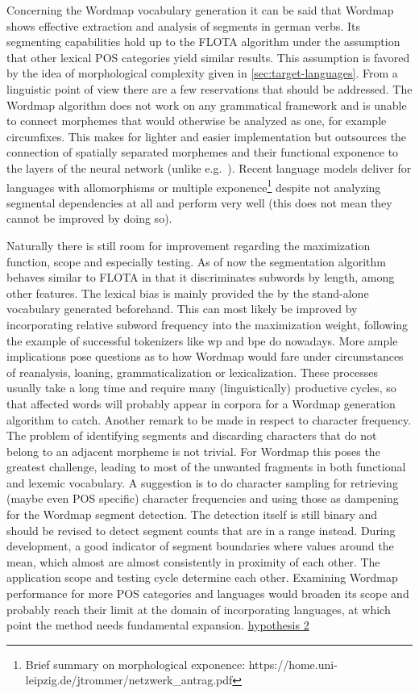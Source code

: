 Concerning the Wordmap vocabulary generation it can be said that Wordmap shows effective extraction and analysis of segments in german verbs.
Its segmenting capabilities hold up to the FLOTA algorithm under the assumption that other lexical POS categories yield similar results.
This assumption is favored by the idea of morphological complexity given in \autoref{sec:target-languages}.
From a linguistic point of view there are a few reservations that should be addressed.
The Wordmap algorithm does not work on any grammatical framework and is unable to connect morphemes that would otherwise be analyzed as one, for example circumfixes.
This makes for lighter and easier implementation but outsources the connection of spatially separated morphemes and their functional exponence to the layers of the neural network (unlike e.g.\ \textcite{BITE}).
Recent language models deliver for languages with allomorphisms or multiple exponence\footnote{Brief summary on morphological exponence: https://home.uni-leipzig.de/jtrommer/netzwerk_antrag.pdf} despite not analyzing segmental dependencies at all and perform very well (this does not mean they cannot be improved by doing so).


Naturally there is still room for improvement regarding the maximization function, scope and especially testing.
As of now the segmentation algorithm behaves similar to FLOTA in that it discriminates subwords by length, among other features.
The lexical bias is mainly provided the by the stand-alone vocabulary generated beforehand.
This can most likely be improved by incorporating relative subword frequency into the maximization weight, following the example of successful tokenizers like \ac{wp} and \ac{bpe} do nowadays.
More ample implications pose questions as to how Wordmap would fare under circumstances of reanalysis, loaning, grammaticalization or lexicalization.
These processes usually take a long time and require many (linguistically) productive cycles, so that affected words will probably appear in corpora for a Wordmap generation algorithm to catch.
Another remark to be made in respect to character frequency.
The problem of identifying segments and discarding characters that do not belong to an adjacent morpheme is not trivial.
For Wordmap this poses the greatest challenge, leading to most of the unwanted fragments in both functional and lexemic vocabulary.
A suggestion is to do character sampling for retrieving (maybe even POS specific) character frequencies and using those as dampening for the Wordmap segment detection.
The detection itself is still binary and should be revised to detect segment counts that are in a range instead.
During development, a good indicator of segment boundaries where values around the mean, which almost are almost consistently in proximity of each other.
The application scope and testing cycle determine each other.
Examining Wordmap performance for more POS categories and languages would broaden its scope and probably reach their limit at the domain of incorporating languages, at which point the method needs fundamental expansion.
\hyperlink{hyp2}{hypothesis 2}